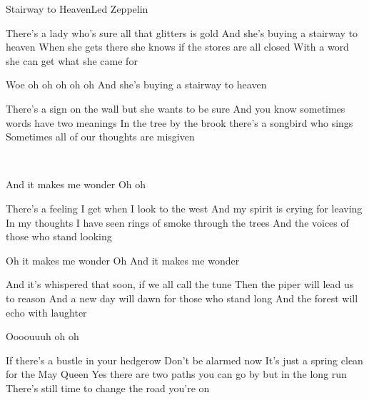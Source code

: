 \documentclass[a4paper,11pt,french]{article}
\begin{document}

\begin{Song}{Stairway to Heaven}{Led Zeppelin}
\begin{multicols}{2}

\begin{Verse}
There's a lady who's sure all that glitters is gold
And she's buying a stairway to heaven
When she gets there she knows if the stores are all closed
With a word she can get what she came for
\espaceInterStrophe

Woe oh oh oh oh oh
And she's buying a stairway to heaven
\end{Verse}
\espaceInterStrophe

\begin{Verse}
There's a sign on the wall but she wants to be sure
And you know sometimes words have two meanings
In the tree by the brook there's a songbird who sings
Sometimes all of our thoughts are misgiven
\end{Verse}
\espaceInterStrophe

\\
\espaceInterStrophe

\begin{Chorus}
And it makes me wonder Oh oh
\end{Chorus}
\espaceInterStrophe

\begin{Verse}
There's a feeling I get when I look to the west
And my spirit is crying for leaving
In my thoughts I have seen rings of smoke through the trees
And the voices of those who stand looking
\end{Verse}
\espaceInterStrophe

\begin{Chorus}
Oh it makes me wonder
Oh And it makes me wonder
\end{Chorus}
\espaceInterStrophe

\begin{Verse}
And it's whispered that soon, if we all call the tune
Then the piper will lead us to reason
And a new day will dawn for those who stand long
And the forest will echo with laughter
\espaceInterStrophe

Oooouuuh oh oh
\end{Verse}
\espaceInterStrophe

\begin{Verse}
If there's a bustle in your hedgerow
Don't be alarmed now
It's just a spring clean for the May Queen
Yes there are two paths you can go by
but in the long run
There's still time to change the road you're on
\end{Verse}
\espaceInterStrophe


\end{multicols}
\end{Song}
\end{document}
